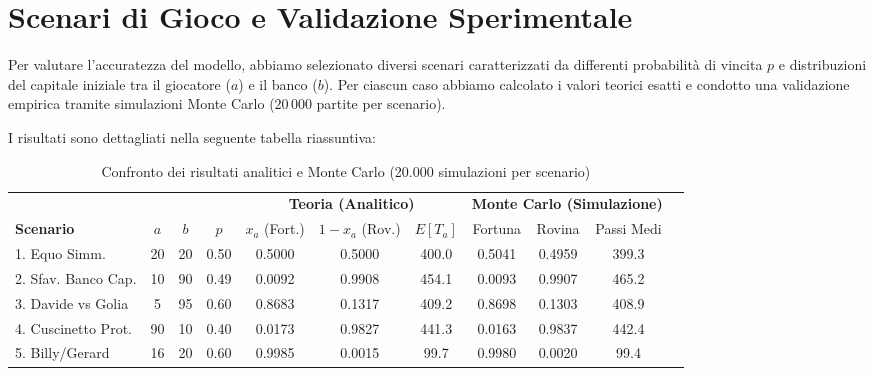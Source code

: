 \documentclass[11pt,a4paper]{article}
\begin{document}
\section{Scenari di Gioco e Validazione Sperimentale}
Per valutare l'accuratezza del modello, abbiamo selezionato diversi scenari caratterizzati da differenti probabilità di vincita $p$ e distribuzioni del capitale iniziale tra il giocatore ($a$) e il banco ($b$). Per ciascun caso abbiamo calcolato i valori teorici esatti e condotto una validazione empirica tramite simulazioni Monte Carlo ($20\,000$ partite per scenario).

I risultati sono dettagliati nella seguente tabella riassuntiva:

\begin{table}[H]
\centering
\small
\setlength{\tabcolsep}{3.5pt}
\caption{Confronto dei risultati analitici e Monte Carlo (20.000 simulazioni per scenario)}
\label{tab:risultati}
\begin{tabular}{lcccccccccc}
\toprule
 & & & & \multicolumn{3}{c}{\textbf{Teoria (Analitico)}} & \multicolumn{3}{c}{\textbf{Monte Carlo (Simulazione)}} \\
\cmidrule(r){5-7} \cmidrule(l){8-10}
\textbf{Scenario} & $a$ & $b$ & $p$ & $x_a$ (Fort.) & $1-x_a$ (Rov.) & $E[T_a]$ & Fortuna & Rovina & Passi Medi \\
\midrule
1. Equo Simm. & 20 & 20 & 0.50 & 0.5000 & 0.5000 & 400.0 & 0.5041 & 0.4959 & 399.3 \\
2. Sfav. Banco Cap. & 10 & 90 & 0.49 & 0.0092 & 0.9908 & 454.1 & 0.0093 & 0.9907 & 465.2 \\
3. Davide vs Golia & 5 & 95 & 0.60 & 0.8683 & 0.1317 & 409.2 & 0.8698 & 0.1303 & 408.9 \\
4. Cuscinetto Prot. & 90 & 10 & 0.40 & 0.0173 & 0.9827 & 441.3 & 0.0163 & 0.9837 & 442.4 \\
5. Billy/Gerard & 16 & 20 & 0.60 & 0.9985 & 0.0015 & 99.7 & 0.9980 & 0.0020 & 99.4 \\
\bottomrule
\end{tabular}
\end{table}
\end{document}
